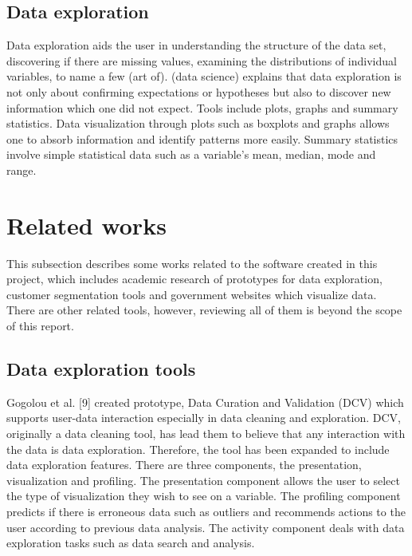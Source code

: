\subsection{Data exploration}
Data exploration aids the user in understanding the structure of the data set, discovering if there are missing values, examining the distributions of individual variables, to name a few (art of). (data science) explains that data exploration is not only about confirming expectations or hypotheses but also to discover new information which one did not expect. Tools include plots, graphs and summary statistics. Data visualization through plots such as boxplots and graphs allows one to absorb information and identify patterns more easily. Summary statistics involve simple statistical data such as a variable’s mean, median, mode and range.

\section{Related works}

This subsection describes some works related to the software created in this project, which includes academic research of prototypes for data exploration, customer segmentation tools and government websites which visualize data. There are other related tools, however, reviewing all of them is beyond the scope of this report.
\par

\subsection{Data exploration tools}

Gogolou et al. [9] created prototype, Data Curation and Validation (DCV) which supports user-data interaction especially in data cleaning and exploration. DCV, originally a data cleaning tool, has lead them to believe that any interaction with the data is data exploration. Therefore, the tool has been expanded to include data exploration features. There are three components, the presentation, visualization and profiling. The presentation component allows the user to select the type of visualization they wish to see on a variable. The profiling component predicts if there is erroneous data such as outliers and recommends actions to the user according to previous data analysis. The activity component deals with data exploration tasks such as data search and analysis.\par

